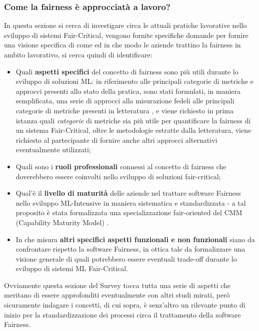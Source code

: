     
   \subsubsection{Come la fairness è approcciatà a lavoro?}
   
   In questa sezione si cerca di investigare circa le attuali pratiche lavorative nello sviluppo di sistemi Fair-Critical, vengono fornite specifiche domande per fornire una visione specifica di come ed in che modo le aziende trattino la fairness in ambito lavorativo, si cerca quindi di identificare:
   
   \begin{itemize}
       \item Quali \textbf{aspetti specifici} del concetto di fairness sono più utili durante lo sviluppo di soluzioni ML: in riferimento alle principali categorie di metriche e approcci presenti allo stato della pratica, sono stati formulati, in maniera semplificata, una serie di approcci alla misurazione fedeli alle principali categorie di metriche presenti in letteratura  \cite{FairnessDefinitionExplained}, e viene richiesto in prima istanza quali \emph{categorie} di metriche sia più utile per quantificare la fairness di un sistema Fair-Critical, oltre le metodologie estratte dalla letteratura, viene richiesto al partecipante di fornire anche altri approcci alternativi eventualmente utilizzati;
       \item Quali sono i \textbf{ruoli professionali} connessi al concetto di fairness che doverebbero essere coinvolti nello sviluppo di soluzioni fair-critical;
       \item Qual'è il \textbf{livello di maturità} delle aziende nel trattare software Fairness nello sviluppo ML-Intensive in maniera sistematica e standardizzata - a tal proposito è stata formalizzata una specializzazione fair-oriented del CMM (Capability Maturity Model) \cite{CMM}.
       \item In che misura \textbf{altri specifici aspetti funzionali e non funzionali} siano da confrontare rispetto la software Fairness, in ottica tale da formalizzare una visione generale di quali potrebbero essere eventuali trade-off durante lo sviluppo di sistemi ML Fair-Critical.
   \end{itemize}
   
   Ovviamente questa sezione del Survey tocca tutta una serie di aspetti che meritano di essere approfonditi eventualmente con altri studi mirati, però sicuramente indagare i concetti, di cui sopra, è senz'altro un rilevante punto di inizio per la standardizzazione dei processi circa il trattamento della software Fairness. \\\\
   
